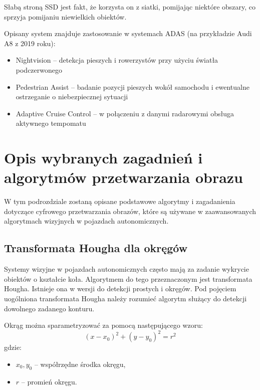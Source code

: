 Słabą stroną SSD jest fakt, że korzysta on z siatki, pomijając niektóre obszary, co sprzyja pomijaniu niewielkich obiektów.

Opisany system znajduje zastosowanie w systemach ADAS (na przykładzie Audi A8 z 2019 roku):
\begin{itemize}
\item Nightvision -- detekcja pieszych i rowerzystów przy użyciu światła podczerwonego
\item Pedestrian Assist -- badanie pozycji pieszych wokół samochodu i ewentualne ostrzeganie o niebezpiecznej sytuacji
\item Adaptive Cruise Control -- w połączeniu z danymi radarowymi obsługa aktywnego tempomatu
\end{itemize}


\section{Opis wybranych zagadnień i algorytmów przetwarzania obrazu}
\label{sec:vision_algs}
W tym podrozdziale zostaną opisane podstawowe algorytmy i zagadanienia dotyczące cyfrowego przetwarzania obrazów, które są używane w zaawansowanych algorytmach wizyjnych w pojazdach autonomicznych. %

\subsection{Transformata Hougha dla okręgów}

Systemy wizyjne w pojazdach autonomicznych często mają za zadanie wykrycie obiektów o kształcie koła. Algorytmem do tego przeznaczonym jest transformata Hougha. 
Istnieje ona w wersji do detekcji prostych i okręgów. 
Pod pojęciem uogólniona transformata Hougha należy rozumieć algorytm służący do detekcji dowolnego zadanego konturu.

Okrąg można sparametryzować za pomocą następującego wzoru:
\begin{equation}
(x-x_0)^2+(y-y_0)^2=r^2
\end{equation}
gdzie:
\begin{itemize}
\item $x_0, y_0$ -- współrzędne środka okręgu,
\item $r$ -- promień okręgu.
\end{itemize}

